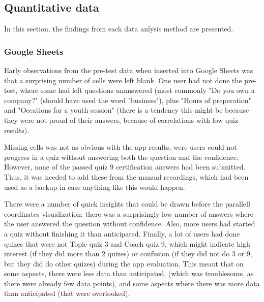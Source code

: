 \subsection{Quantitative data}






In this section, the findings from each data anlysis method are presented.

\subsubsection{Google Sheets} 
Early observations from the pre-test data when inserted into Google Sheets was that a surprising number of cells were left blank. One user had not done the pre-test, where some had left questions unanswered (most commonly "Do you own a company?" (should have used the word "business"), plus "Hours of preperation" and "Occations for a youth session" (there is a tendency this might be because they were not proud of their answers, because of correlations with low quiz results).

Missing cells was not as obvious with the app results, were users could not progress in a quiz without answering both the question and the confidence. However, none of the passed quiz 9 certification answers had been submitted. Thus, it was needed to add these from the manual recordings, which had been used as a backup in case anything like this would happen.

There were a number of quick insights that could be drawn before the parallell coordinates visualization: there was a surprisingly low number of answers where the user answered the question without confidence. Also, more users had started a quiz without finishing it than anticipated. Finally, a lot of users had done quizes that were not Topic quiz 3 and Coach quiz 9, which might indicate high interest (if they did more than 2 quizes) or confusion (if they did not do 3 or 9, but they did do other quizes) during the app evaluation. This meant that on some aspects, there were less data than anticipated, (which was troublesome, as there were already few data points), and some aspects where there was more data than anticipated (that were overlooked).

